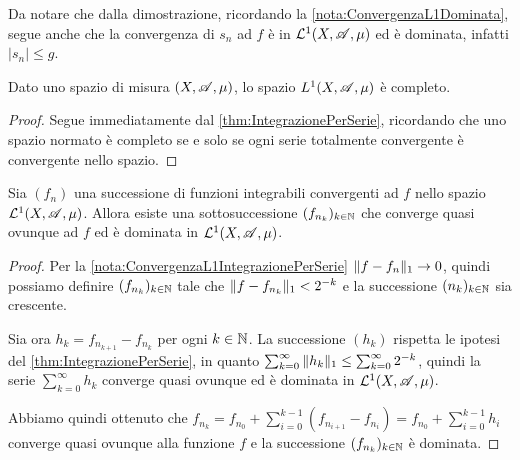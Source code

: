 \begin{remark}\label{nota:ConvergenzaL1IntegrazionePerSerie}
	Da notare che dalla dimostrazione, ricordando la \cref{nota:ConvergenzaL1Dominata}, segue anche che la convergenza di $s_n$ ad $f$ è in $\mathcal L^1(X,\mathscr A,\mu)$ ed è dominata, infatti $|s_n|\le g$.
\end{remark}


\begin{corollary}
	Dato uno spazio di misura $(X,\mathscr A,\mu)$, lo spazio $L^1(X,\mathscr A,\mu)$ è completo.
\end{corollary}

\begin{proof}
	Segue immediatamente dal \cref{thm:IntegrazionePerSerie}, ricordando che uno spazio normato è completo se e solo se ogni serie totalmente convergente è convergente nello spazio.
\end{proof}

\begin{proposition}\label{prop:L1ImplicaSottosuccessioneQuasiOvunque}
	Sia $(f_n)$ una successione di funzioni integrabili convergenti ad $f$ nello spazio $\mathcal L^1(X,\mathscr A,\mu)$. Allora esiste una sottosuccessione $(f_{n_k})_{k\in\mathbb N}$ che converge quasi ovunque ad $f$ ed è dominata in $\mathcal L^1(X,\mathscr A,\mu)$.
\end{proposition}

\begin{proof}
	Per la \cref{nota:ConvergenzaL1IntegrazionePerSerie} $\Vert f-f_n\Vert_1\to 0$, quindi possiamo definire $(f_{n_k})_{k\in\mathbb N}$ tale che $\Vert f-f_{n_k}\Vert_1<2^{-k}$ e la successione $(n_k)_{k\in\mathbb N}$ sia crescente.
	
	Sia ora $h_k=f_{n_{k+1}}-f_{n_k}$ per ogni $k\in\mathbb N$. La successione $(h_k)$ rispetta le ipotesi del \cref{thm:IntegrazionePerSerie}, in quanto $\sum_{k=0}^\infty \Vert h_k\Vert_1\le \sum_{k=0}^\infty 2^{-k}$, quindi la serie $\sum_{k=0}^\infty h_k$ converge quasi ovunque ed è dominata in $\mathcal L^1(X,\mathscr A,\mu)$.
	
	Abbiamo quindi ottenuto che $f_{n_k}=f_{n_0}+\sum_{i=0}^{k-1}(f_{n_{i+1}}-f_{n_i})=f_{n_0}+\sum_{i=0}^{k-1} h_i$ converge quasi ovunque alla funzione $f$ e la successione $(f_{n_k})_{k\in\mathbb N}$ è dominata.
\end{proof}

